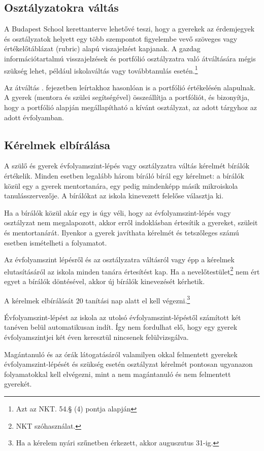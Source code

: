 \subsection{Osztályzatokra váltás}
\label{sec:osztalyzatok}
A Budapest School kerettanterve lehetővé teszi, hogy a gyerekek az érdemjegyek
és osztályzatok
helyett egy több szempontot figyelembe vevő szöveges vagy értékelőtáblázat
(rubric) alapú viszajelzést kapjanak.
A gazdag információtartalmú visszajelzések és portfólió osztályzatra való
átváltására mégis szükség lehet, például iskolaváltás vagy továbbtanulás
esetén.\footnote{Azt az NKT. 54.§ (4) pontja alapján}

Az átváltás .
fejezetben leírtakhoz
hasonlóan is a portfólió értékelésén alapulnak.
A gyerek (mentora és szülei segítségével) összeállítja a portfóliót, és
bizonyítja, hogy a portfólió alapján megállapítható a kívánt osztályzat, az
adott tárgyhoz az adott évfolyamban.

\subsection{Kérelmek elbírálása}

A szülő és gyerek évfolyamszint-lépés vagy osztályzatra váltás kérelmét bírálók
értékelik. Minden esetben legalább három bíráló bírál egy kérelmet: a
bírálók közül egy a gyerek mentortanára, egy pedig mindenképp másik mikroiskola
tanulásszervezője. A bírálókat az iskola kinevezett felelőse választja ki.

Ha a bírálók közül akár egy is úgy véli, hogy az évfolyamszint-lépés vagy
osztályzat nem megalapozott, akkor
erről indoklásban értesítik a gyereket, szüleit és mentortanárát. Ilyenkor a
gyerek javíthata kérelmét és tetszőleges számú esetben ismételheti a
folyamatot.

Az évfolyamszint lépésről és az osztályzatra váltásról vagy épp a kérelmek
elutasításáról az iskola minden tanára értesítést kap. Ha a
nevelőtestület\footnote{NKT szóhasználat.}
nem ért egyet a bírálók döntésével, akkor új bírálók kinevezését kérhetik.

A kérelmek elbírálását 20 tanítási nap alatt el kell végezni.\footnote{Ha a
    kérelem nyári szűnetben érkezett, akkor auguszutus 31-ig.}

Évfolyamszint-lépést az iskola az utolsó évfolyamszint-lépéstől számított két
tanéven belül automatikusan indít. Így nem fordulhat elő, hogy egy gyerek
évfolyamszintjei két éven keresztül nincsenek felülvizsgálva.

Magántanuló és az órák látogatásáról valamilyen okkal felmentett gyerekek
évfolyamszint-lépését és szükség esetén osztályzat kérelmét pontosan ugyanazon
folyamatokkal kell elvégezni, mint a nem magántanuló és nem felmentett
gyerekét.